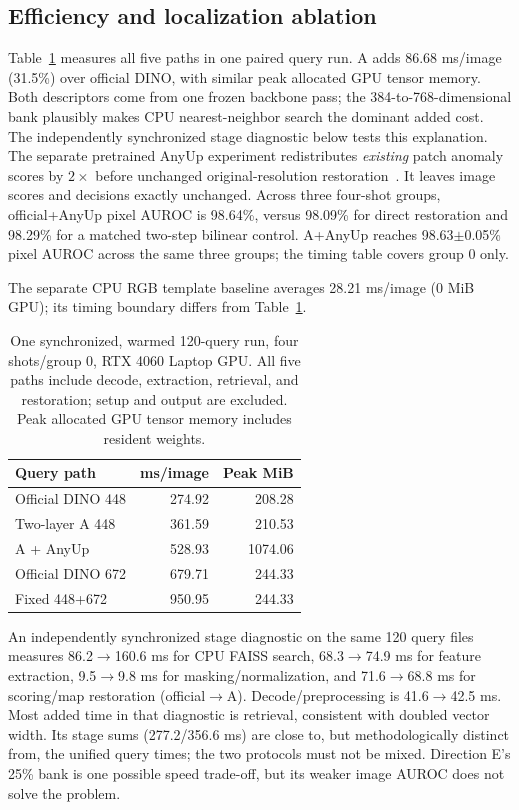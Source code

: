 \documentclass[times,10pt,twocolumn,letterpaper]{article}
\begin{document}
\subsection{Efficiency and localization ablation}
Table~\ref{tab:efficiency} measures all five paths in one paired query run. A adds 86.68 ms/image (31.5\%) over official DINO, with similar peak allocated GPU tensor memory. Both descriptors come from one frozen backbone pass; the 384-to-768-dimensional bank plausibly makes CPU nearest-neighbor search the dominant added cost. The independently synchronized stage diagnostic below tests this explanation. The separate pretrained AnyUp experiment redistributes \emph{existing} patch anomaly scores by $2\times$ before unchanged original-resolution restoration~\cite{wimmer2026anyup}. It leaves image scores and decisions exactly unchanged. Across three four-shot groups, official+AnyUp pixel AUROC is 98.64\%, versus 98.09\% for direct restoration and 98.29\% for a matched two-step bilinear control. A+AnyUp reaches 98.63$\pm$0.05\% pixel AUROC across the same three groups; the timing table covers group 0 only.

The separate CPU RGB template baseline averages 28.21 ms/image (0 MiB GPU); its timing boundary differs from Table~\ref{tab:efficiency}.

\begin{table}[t]
\centering
\caption{One synchronized, warmed 120-query run, four shots/group 0, RTX 4060 Laptop GPU. All five paths include decode, extraction, retrieval, and restoration; setup and output are excluded. Peak allocated GPU tensor memory includes resident weights.}
\label{tab:efficiency}
\small
\begin{tabular}{lrr}
\toprule
Query path & ms/image & Peak MiB\\
\midrule
Official DINO 448 & 274.92 & 208.28\\
Two-layer A 448 & 361.59 & 210.53\\
A + AnyUp & 528.93 & 1074.06\\
Official DINO 672 & 679.71 & 244.33\\
Fixed 448+672 & 950.95 & 244.33\\
\bottomrule
\end{tabular}
\end{table}

An independently synchronized stage diagnostic on the same 120 query files measures 86.2$\rightarrow$160.6 ms for CPU FAISS search, 68.3$\rightarrow$74.9 ms for feature extraction, 9.5$\rightarrow$9.8 ms for masking/normalization, and 71.6$\rightarrow$68.8 ms for scoring/map restoration (official$\rightarrow$A). Decode/preprocessing is 41.6$\rightarrow$42.5 ms. Most added time in that diagnostic is retrieval, consistent with doubled vector width. Its stage sums (277.2/356.6 ms) are close to, but methodologically distinct from, the unified query times; the two protocols must not be mixed. Direction E's 25\% bank is one possible speed trade-off, but its weaker image AUROC does not solve the problem.
\end{document}
